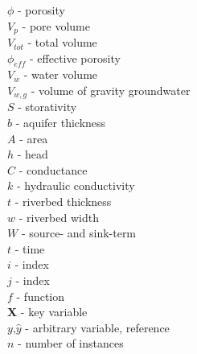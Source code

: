 \begin{tabbing}
    \> $\phi$ \> - \> porosity\\

    \> $V_p$ \> - \> pore volume\\

    \> $V_{tot}$ \> - \> total volume\\

    \> $\phi_{eff}$ \> - \> effective porosity\\

    \> $V_{w}$ \> - \> water volume\\

    \> $V_{w,g}$ \> - \> volume of gravity groundwater\\

    \> $S$ \> - \> storativity\\

    \> $b$ \> - \> aquifer thickness\\

    \> $A$ \> - \> area\\

    \> $h$ \> - \> head\\

    \> $C$ \> - \> conductance\\

    \> $k$ \> - \> hydraulic conductivity\\

    \> $t$ \> - \> riverbed thickness\\

    \> $w$ \> - \> riverbed width\\

    \> $W$ \> - \> source- and sink-term\\

    \> $t$ \> - \> time\\

    \> $i$ \> - \> index\\

    \> $j$ \> - \> index\\

    \> $f$ \> - \> function\\

    \> $\bm{X}$ \> - \> key variable\\

    \> $y$,$\hat{y}$ \> - \> arbitrary variable, reference\\

    \> $n$ \> - \> number of instances\\


\end{tabbing}

